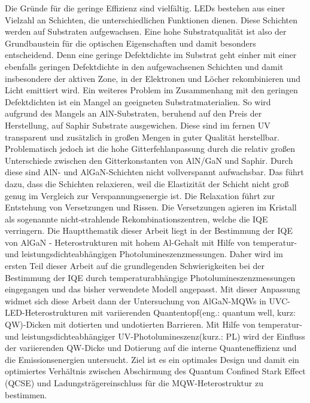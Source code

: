 Die Gründe für die geringe Effizienz sind vielfältig. LEDs bestehen aus einer Vielzahl an Schichten, die unterschiedlichen Funktionen dienen. Diese Schichten werden auf Substraten aufgewachsen. Eine hohe Substratqualität ist also der Grundbaustein für die optischen Eigenschaften und damit besonders entscheidend. Denn eine geringe Defektdichte im Substrat geht einher mit einer ebenfalls geringen Defektdichte in den aufgewachsenen Schichten und damit insbesondere der aktiven Zone, in der Elektronen und Löcher rekombinieren und Licht emittiert wird.
\newline
Ein weiteres Problem im Zusammenhang mit den geringen Defektdichten ist ein Mangel an geeigneten Substratmaterialien. So wird aufgrund des Mangels an AlN-Substraten, beruhend auf den Preis der Herstellung, auf Saphir Substrate ausgewichen. Diese sind im fernen UV transparent und zusätzlich in großen Mengen in guter Qualität herstellbar. Problematisch jedoch ist die hohe Gitterfehlanpassung durch die relativ großen Unterschiede zwischen den Gitterkonstanten von AlN/GaN und Saphir. Durch diese sind AlN- und AlGaN-Schichten nicht vollverspannt aufwachsbar. Das führt dazu, dass die Schichten relaxieren, weil die Elastizität der Schicht nicht groß genug im Vergleich zur Verspannungsenergie ist. Die Relaxation führt zur Entstehung von Versetzungen und Rissen. Die Versetzungen agieren im Kristall als sogenannte nicht-strahlende Rekombinationszentren, welche die IQE verringern. 
\newline
Die Hauptthematik dieser Arbeit liegt in der Bestimmung der IQE von AlGaN - Heterostrukturen mit hohem Al-Gehalt mit Hilfe von temperatur- und leistungsdichteabhängigen Photolumineszenzmessungen.
Daher wird im ersten Teil dieser Arbeit auf die grundlegenden Schwierigkeiten bei der Bestimmung der IQE durch temperaturabhängige Photolumineszenzmessungen eingegangen und das bisher verwendete Modell angepasst. 
\newline
Mit dieser Anpassung widmet sich diese Arbeit dann der Untersuchung von AlGaN-MQWs in UVC-LED-Heterostrukturen mit variierenden Quantentopf(eng.: quantum well, kurz: QW)-Dicken mit dotierten und undotierten Barrieren. Mit Hilfe von temperatur- und leistungsdichteabhängiger UV-Photolumineszenz(kurz.: PL) wird der Einfluss der variierenden QW-Dicke und Dotierung auf die interne Quanteneffizienz und die Emissionsenergien untersucht. Ziel ist es ein optimales Design und damit ein optimiertes Verhältnis zwischen Abschirmung des Quantum Confined Stark Effect (QCSE) und Ladungsträgereinschluss für die MQW-Heterostruktur zu bestimmen.
